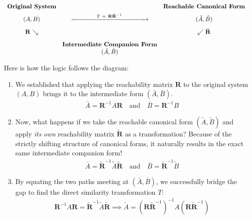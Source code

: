 \documentclass[twoside, 11pt, a4paper]{article}
\begin{document}
\vspace{0.15in}
\begin{equation*}
\begin{array}{ccc}
\text{\textbf{Original System}} & & \text{\textbf{Reachable Canonical Form}} \\[1ex]
(A, B) & \xrightarrow{\qquad \qquad T \ = \ \mathbf{R} \tilde{\mathbf{R}}^{-1} \qquad \qquad} & (\tilde{A}, \tilde{B}) \\[2ex]
\mathbf{R} \searrow & & \swarrow \tilde{\mathbf{R}} \\[2ex]
& \text{\textbf{Intermediate Companion Form}} & \\
& (\bar{A}, \bar{B}) &
\end{array}
\end{equation*}
\vspace{0.15in}

Here is how the logic follows the diagram:
\begin{enumerate}
    \item We established that applying the reachability matrix $\mathbf{R}$ to the original system $(A,B)$ brings it to the intermediate form $(\bar{A}, \bar{B})$. 
    \begin{align*}
        \bar{A} = \mathbf{R}^{-1} A \mathbf{R} \quad \text{and} \quad \bar{B} = \mathbf{R}^{-1} B 
    \end{align*}
    \item Now, what happens if we take the reachable canonical form $(\tilde{A}, \tilde{B})$ and apply \textit{its own} reachability matrix $\tilde{\mathbf{R}}$ as a transformation? Because of the strictly shifting structure of canonical forms, it naturally results in the exact same intermediate companion form! 
    \begin{align*}
        \bar{A} = \tilde{\mathbf{R}}^{-1} \tilde{A} \tilde{\mathbf{R}} \quad \text{and} \quad \bar{B} = \tilde{\mathbf{R}}^{-1} \tilde{B} 
    \end{align*}
    \item By equating the two paths meeting at $(\bar{A}, \bar{B})$, we successfully bridge the gap to find the direct similarity transformation $T$:
    \begin{align*}
        \mathbf{R}^{-1} A \mathbf{R} = \tilde{\mathbf{R}}^{-1} \tilde{A} \tilde{\mathbf{R}} \implies \tilde{A} = (\mathbf{R} \tilde{\mathbf{R}}^{-1})^{-1} A (\mathbf{R} \tilde{\mathbf{R}}^{-1})
    \end{align*}
\end{enumerate}
\end{document}
